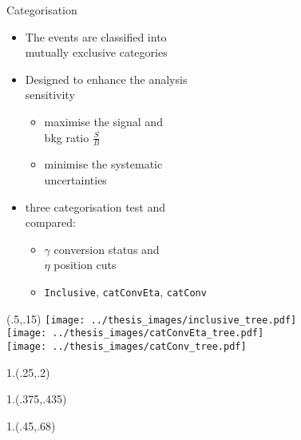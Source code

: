 \documentclass[10pt,UKenglish, leqno, xcolor = dvipsnames]{beamer}
\begin{document}
	\begin{frame}{Categorisation}
		\vfill
		\begin{itemize}
			\item The events are classified into\\ mutually exclusive categories
			\item Designed to enhance the analysis\\ sensitivity
			\begin{itemize}
				\item maximise the signal and\\ bkg ratio $\frac{S}{B}$
				\item minimise the systematic\\ uncertainties
			\end{itemize}
			\item three categorisation test and\\ compared:
			\begin{itemize}
				\item $\gamma$ conversion status and\\ $\eta$ position cuts
				\item \texttt{Inclusive}, \texttt{catConvEta}, \texttt{catConv}
			\end{itemize}
		\end{itemize}
		\begin{textblock}{1}(.5,.15)
			\texttt{[image: ../thesis\_images/inclusive\_tree.pdf]}\\
			\texttt{[image: ../thesis\_images/catConvEta\_tree.pdf]}\\
			\texttt{[image: ../thesis\_images/catConv\_tree.pdf]}\\	
		\end{textblock}	
		\vfill
		\begin{textblock}{1.}(.25,.2)
		\end{textblock}
		\begin{textblock}{1.}(.375,.435)
		\end{textblock}
		\begin{textblock}{1.}(.45,.68)

\end{textblock}
\end{frame}
\end{document}
